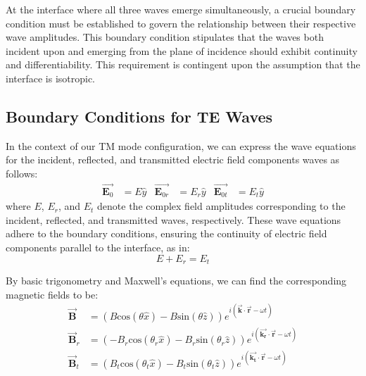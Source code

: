 At the interface where all three waves emerge simultaneously, a crucial boundary condition must be established to govern the relationship between their respective wave amplitudes. This boundary condition stipulates that the waves both incident upon and emerging from the plane of incidence should exhibit continuity and differentiability. This requirement is contingent upon the assumption that the interface is isotropic.

\subsection{Boundary Conditions for TE Waves}
In the context of our TM mode configuration, we can express the wave equations for the incident, reflected, and transmitted electric field components waves as follows:
\begin{align*}
\vec{\mathbf{E}_0} &= E\hat{y}           &  \vec{\mathbf{E}_{0r}} &= E_r\hat{y}               &  \vec{\mathbf{E}_{0t}} &= E_t\hat{y}
\end{align*}
where $E$, $E_r$, and $E_t$ denote the complex field amplitudes corresponding to the incident, reflected, and transmitted waves, respectively. These wave equations adhere to the boundary conditions, ensuring the continuity of electric field components parallel to the interface, as in:
\begin{equation} \label{Electric field boundary conditions for TE waves}
E + E_r = E_t
\end{equation}

By basic trigonometry and Maxwell's equations, we can find the corresponding magnetic fields to be:
\begin{align*} 
\vec{\mathbf{B}} &= (B\mathrm{cos}(\theta \hat{x}) - B\mathrm{sin}(\theta \hat{z})) e^{i(\vec{\mathbf{k}} \cdot \vec{\mathbf{r}} - \omega t)} \\
\vec{\mathbf{B}}_r &= (-B_r\mathrm{cos}(\theta_r \hat{x}) - B_r\mathrm{sin}(\theta_r \hat{z})) e^{i(\vec{\mathbf{k_r}} \cdot \vec{\mathbf{r}} - \omega t)} \\ 
\vec{\mathbf{B}}_t &= (B_t\mathrm{cos}(\theta_t \hat{x}) - B_t\mathrm{sin}(\theta_t \hat{z})) e^{i(\vec{\mathbf{k_t}} \cdot \vec{\mathbf{r}} - \omega t)}
\end{align*}


